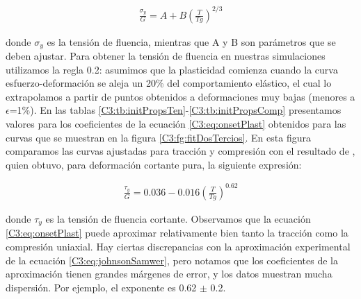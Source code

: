 \begin{eqnarray}
\frac{\sigma{}_{y}}{G} = A+B\left( \frac{T}{Tg} \right)^{2/3}
\label{C3:eq:onsetPlast}
\end{eqnarray}

donde $\sigma{}_{y}$ es la tensión de fluencia, mientras que A y B son parámetros que se deben ajustar. Para obtener la tensión de fluencia en nuestras simulaciones utilizamos la regla 0.2: asumimos que la plasticidad comienza cuando la curva esfuerzo-deformación se aleja un 20\% del comportamiento elástico, el cual lo extrapolamos a partir de puntos obtenidos a deformaciones muy bajas (menores a $\epsilon$=1\%). En las tablas \ref{C3:tb:initPropsTen}-\ref{C3:tb:initPropsComp} presentamos valores para los coeficientes de la ecuación \ref{C3:eq:onsetPlast} obtenidos para las curvas que se muestran en la figura \ref{C3:fg:fitDosTercios}. En esta figura comparamos las curvas ajustadas para tracción y compresión con el resultado de \cite{johnson05}, quien obtuvo, para  deformación cortante pura, la siguiente expresión:


\begin{eqnarray}
\frac{\tau _{y}}{G} = 0.036-0.016\left( \frac{T}{Tg} \right)^{0.62}
\label{C3:eq:johnsonSamwer}
\end{eqnarray}

donde $\tau _{y}$ es la tensión de fluencia cortante. Observamos que la ecuación \ref{C3:eq:onsetPlast} puede aproximar relativamente bien tanto la tracción como la compresión uniaxial. Hay ciertas discrepancias con la aproximación experimental de la ecuación \ref{C3:eq:johnsonSamwer}, pero notamos que los coeficientes de la aproximación tienen grandes márgenes de error, y los datos muestran mucha dispersión. Por ejemplo, el exponente es  0.62 $\pm$ 0.2.
	


